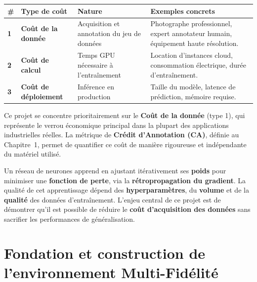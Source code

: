 \documentclass[11pt,a4paper,openany]{book}
\newcommand{\tableheadcolor}{\rowcolor{headerbg}}
\newcommand{\tablerowodd}{}
\begin{document}
\vspace{0.8em}
\renewcommand{\arraystretch}{1.5}
\begin{tabularx}{\linewidth}{C{0.5cm} L{3.2cm} L{5cm} L{7.3cm}}
  \toprule
  \tableheadcolor
  \textbf{\#} & \textbf{Type de coût} & \textbf{Nature} & \textbf{Exemples concrets} \\
  \midrule
  \tablerowodd
  \textbf{1} & \textbf{Coût de la donnée} & Acquisition et annotation du jeu de données & Photographe professionnel, expert annotateur humain, équipement haute résolution. \\
  \textbf{2} & \textbf{Coût de calcul} & Temps GPU nécessaire à l'entraînement & Location d'instances cloud, consommation électrique, durée d'entraînement. \\
  \tablerowodd
  \textbf{3} & \textbf{Coût de déploiement} & Inférence en production & Taille du modèle, latence de prédiction, mémoire requise. \\
  \bottomrule
\end{tabularx}

\vspace{0.5em}
Ce projet se concentre prioritairement sur le \textbf{Coût de la donnée} (type 1), qui représente le verrou économique principal dans la plupart des applications industrielles réelles. La métrique de \textbf{Crédit d'Annotation (CA)}, définie au Chapitre~1, permet de quantifier ce coût de manière rigoureuse et indépendante du matériel utilisé.

\begin{hypothesebox}
  Un réseau de neurones apprend en ajustant itérativement ses \textbf{poids} pour minimiser une \textbf{fonction de perte}, via la \textbf{rétropropagation du gradient}. La qualité de cet apprentissage dépend des \textbf{hyperparamètres}, du \textbf{volume} et de la \textbf{qualité} des données d'entraînement. L'enjeu central de ce projet est de démontrer qu'il est possible de réduire le \textbf{coût d'acquisition des données} sans sacrifier les performances de généralisation.
\end{hypothesebox}

\newpage
\chapter{Fondation et construction de l'environnement Multi-Fidélité}
\end{document}
